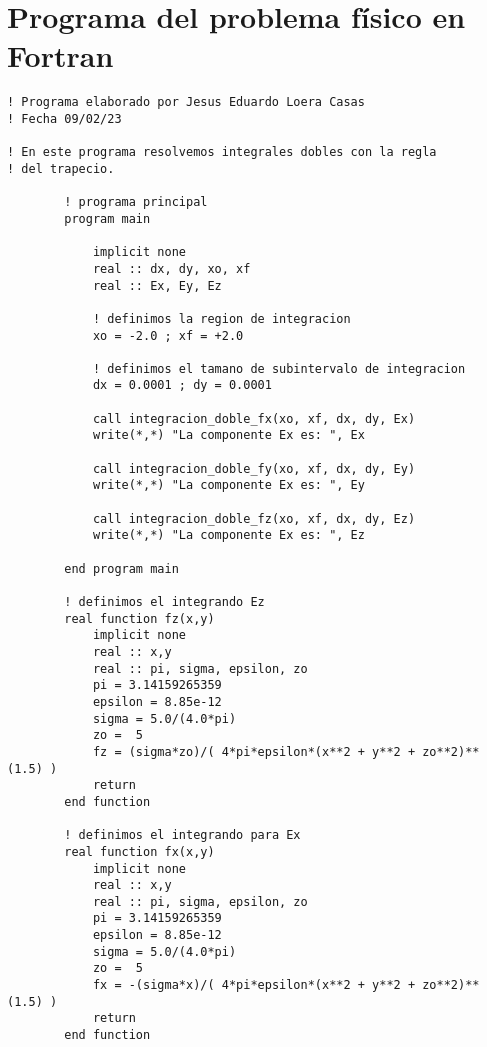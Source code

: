 \section{Programa del problema físico en Fortran}


\begin{lstlisting}
! Programa elaborado por Jesus Eduardo Loera Casas
! Fecha 09/02/23

! En este programa resolvemos integrales dobles con la regla
! del trapecio.

        ! programa principal
        program main

            implicit none
            real :: dx, dy, xo, xf
            real :: Ex, Ey, Ez

            ! definimos la region de integracion
            xo = -2.0 ; xf = +2.0

            ! definimos el tamano de subintervalo de integracion
            dx = 0.0001 ; dy = 0.0001

            call integracion_doble_fx(xo, xf, dx, dy, Ex)
            write(*,*) "La componente Ex es: ", Ex

            call integracion_doble_fy(xo, xf, dx, dy, Ey)
            write(*,*) "La componente Ex es: ", Ey

            call integracion_doble_fz(xo, xf, dx, dy, Ez)
            write(*,*) "La componente Ex es: ", Ez

        end program main

        ! definimos el integrando Ez
        real function fz(x,y)
            implicit none
            real :: x,y
            real :: pi, sigma, epsilon, zo
            pi = 3.14159265359
            epsilon = 8.85e-12
            sigma = 5.0/(4.0*pi)
            zo =  5
            fz = (sigma*zo)/( 4*pi*epsilon*(x**2 + y**2 + zo**2)**(1.5) )
            return
        end function

        ! definimos el integrando para Ex
        real function fx(x,y)
            implicit none
            real :: x,y
            real :: pi, sigma, epsilon, zo
            pi = 3.14159265359
            epsilon = 8.85e-12
            sigma = 5.0/(4.0*pi)
            zo =  5
            fx = -(sigma*x)/( 4*pi*epsilon*(x**2 + y**2 + zo**2)**(1.5) )
            return
        end function


\end{lstlisting}
